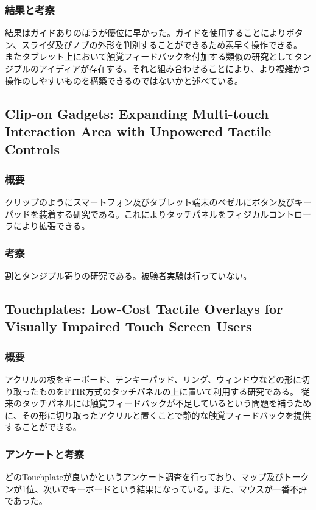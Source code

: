 \documentclass[11pt,a4paper]{jarticle}
\begin{document}
\subsubsection{結果と考察}
結果はガイドありのほうが優位に早かった。ガイドを使用することによりボタン、スライダ及びノブの外形を判別することができるため素早く操作できる。
またタブレット上において触覚フィードバックを付加する類似の研究としてタンジブルのアイディアが存在する。それと組み合わせることにより、より複雑かつ操作のしやすいものを構築できるのではないかと述べている。

\subsection{Clip-on Gadgets: Expanding Multi-touch
Interaction Area with Unpowered Tactile Controls}
\subsubsection{概要}
クリップのようにスマートフォン及びタブレット端末のベゼルにボタン及びキーパッドを装着する研究である。これによりタッチパネルをフィジカルコントローラにより拡張できる。


\subsubsection{考察}
割とタンジブル寄りの研究である。被験者実験は行っていない。


\subsection{Touchplates: Low-Cost Tactile Overlays for Visually
Impaired Touch Screen Users}
\subsubsection{概要}
アクリルの板をキーボード、テンキーパッド、リング、ウィンドウなどの形に切り取ったものをFTIR方式のタッチパネルの上に置いて利用する研究である。
従来のタッチパネルには触覚フィードバックが不足しているという問題を補うために、その形に切り取ったアクリルと置くことで静的な触覚フィードバックを提供することができる。
\subsubsection{アンケートと考察}
どのTouchplateが良いかというアンケート調査を行っており、マップ及びトークンが1位、次いでキーボードという結果になっている。また、マウスが一番不評であった。
\end{document}

